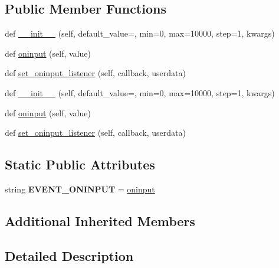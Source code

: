 \subsection*{Public Member Functions}
\begin{DoxyCompactItemize}
\item 
def \hyperlink{classremi_1_1gui_1_1Slider_ad512ff20cf037d5a29f013d914fd0058}{\+\_\+\+\_\+init\+\_\+\+\_\+} (self, default\+\_\+value=\textquotesingle{}\textquotesingle{}, min=0, max=10000, step=1, kwargs)
\item 
def \hyperlink{classremi_1_1gui_1_1Slider_a5b06b37f09c85df50ecbbc86d89d8d8e}{oninput} (self, value)
\item 
def \hyperlink{classremi_1_1gui_1_1Slider_a6d57d07fb4c1ec08109b4f8748a795c5}{set\+\_\+oninput\+\_\+listener} (self, callback, userdata)
\item 
def \hyperlink{classremi_1_1gui_1_1Slider_ad512ff20cf037d5a29f013d914fd0058}{\+\_\+\+\_\+init\+\_\+\+\_\+} (self, default\+\_\+value=\textquotesingle{}\textquotesingle{}, min=0, max=10000, step=1, kwargs)
\item 
def \hyperlink{classremi_1_1gui_1_1Slider_a5b06b37f09c85df50ecbbc86d89d8d8e}{oninput} (self, value)
\item 
def \hyperlink{classremi_1_1gui_1_1Slider_a6d57d07fb4c1ec08109b4f8748a795c5}{set\+\_\+oninput\+\_\+listener} (self, callback, userdata)
\end{DoxyCompactItemize}
\subsection*{Static Public Attributes}
\begin{DoxyCompactItemize}
\item 
string {\bfseries E\+V\+E\+N\+T\+\_\+\+O\+N\+I\+N\+P\+UT} = \textquotesingle{}\hyperlink{classremi_1_1gui_1_1Slider_a5b06b37f09c85df50ecbbc86d89d8d8e}{oninput}\textquotesingle{}\hypertarget{classremi_1_1gui_1_1Slider_a67933379cb91a9d7f8fa769b5190f932}{}\label{classremi_1_1gui_1_1Slider_a67933379cb91a9d7f8fa769b5190f932}

\end{DoxyCompactItemize}
\subsection*{Additional Inherited Members}


\subsection{Detailed Description}
\begin{DoxyVerb}\end{DoxyVerb}
 

